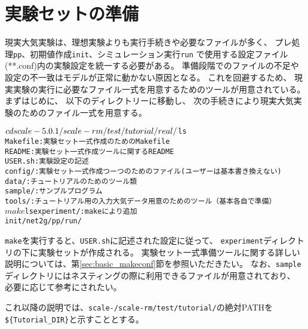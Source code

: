 \section{実験セットの準備} \label{sec:tutrial_real_prep}

現実大気実験は、理想実験よりも実行手続きや必要なファイルが多く、
プレ処理\verb|pp|、初期値作成\verb|init|、シミュレーション実行\verb|run|
で使用する設定ファイル(**.conf)内の実験設定を統一する必要がある。
準備段階でのファイルの不足や設定の不一致はモデルが正常に動かない原因となる。
これを回避するため、
現実実験の実行に必要なファイル一式を用意するためのツールが用意されている。
まずはじめに、
以下のディレクトリーに移動し、
次の手続きにより現実大気実験のためのファイル一式を用意する。
\begin{alltt}
 $ cd scale-{\version}/scale-rm/test/tutorial/real/
 $ ls 
    Makefile : 実験セット一式作成のためのMakefile
    README   : 実験セット一式作成ツールに関するREADME
    USER.sh  : 実験設定の記述
    config/  : 実験セット一式作成つーつのためのファイル(ユーザーは基本書き換えない)
    data/    : チュートリアルのためのツール類
    sample/  : サンプルプログラム
    tools/   : チュートリアル用の入力大気データ用意のためのツール（基本各自で準備）
 $ make
 $ ls experiment/    : make により追加
   init/  net2g/  pp/  run/
\end{alltt}
\verb|make|を実行すると、\verb|USER.sh|に記述された設定に従って、
\verb|experiment|ディレクトリの下に実験セットが作成される。
実験セット一式準備ツールに関する詳しい説明については、第\ref{sec:basic_makeconf}節を参照いただきたい。
なお、\verb|sample|ディレクトリにはネスティングの際に利用できるファイルが用意されており、
必要に応じて参考にされたい。

これ以降の説明では、\texttt{scale-{\version}/scale-rm/test/tutorial/}の絶対PATHを
\verb|${Tutorial_DIR}|と示すこととする。

